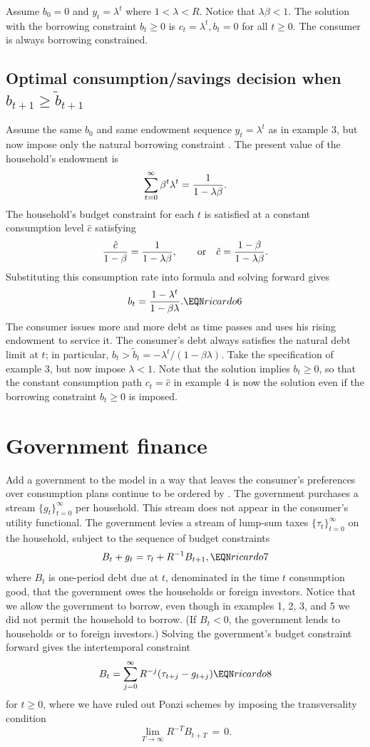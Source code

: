 \medskip
{} \quad  Assume $b_0=0$ and
$ y_t = \lambda^t$ where $1 < \lambda < R$.  Notice that
$\lambda \beta <1$.  The solution with the borrowing constraint
$b_t \geq 0$ is $c_t = \lambda^t , b_t=0$ for all $t \geq 0$.
The consumer is always borrowing constrained.
\medskip

\subsection{Optimal  consumption/savings decision when $b_{t+1} \geq \tilde b_{t+1}$}
 \quad  Assume the same  $b_0$ and same endowment
sequence $ y_t = \lambda^t$ as in example 3, but now impose only
the natural borrowing constraint .   The present
value of the household's endowment is
$$ \sum_{t=0}^\infty \beta^t \lambda^t = {1 \over 1 -\lambda \beta}.$$
The household's budget constraint for each $t$ is
satisfied at a constant consumption level $\hat c$ satisfying
$$
{\hat c \over 1 -\beta} = {1 \over 1-\lambda \beta}, \qquad \hbox{\rm or}
\quad  \hat c = {1-\beta \over 1 - \lambda \beta}.
$$   Substituting
this consumption rate into formula  and solving forward gives
$$ b_t =
   {1  - \lambda^t \over 1 - \beta \lambda }. \EQN ricardo6$$
   The consumer issues more and more debt as time passes
and uses his rising endowment to service it.   The
consumer's debt always satisfies the
natural debt limit at $t$; in particular, $ b_t > \tilde b_t = -\lambda^t /(1 - \beta \lambda)$.
\medskip
{} \quad   Take the specification of example 3,
but now impose  $\lambda <1$.    Note that the solution
 implies $b_t  \geq 0$, so that the constant consumption
path $c_t = \hat c$ in example 4
 is now the solution even if the borrowing constraint $b_t \geq 0$
is imposed.

\section{Government finance}
Add a government  to the model in a way that leaves the consumer's preferences over consumption plans continue to be ordered by
.   The government
purchases a stream $\{g_t\}_{t=0}^\infty$  per household.  This stream does not appear in the consumer's utility functional.
The government levies
 a stream of lump-sum taxes $\{\tau_t\}_{t=0}^\infty$
on the   household, subject to the sequence of budget constraints
$$ B_t + g_t = \tau_t + R^{-1} B_{t+1}, \EQN ricardo7 $$
where $B_t$ is one-period  debt  due at $t$, denominated
in the time $t$ consumption good, that the government owes the households
or foreign investors.  Notice that we allow the government
to borrow, even though in  examples 1, 2,  3, and 5
 we did not permit the household to borrow. (If $B_t <0$, the
government lends to households or to foreign investors.)  Solving the
government's budget constraint forward gives the intertemporal constraint
$$ B_t = \sum_{j=0}^\infty R^{-j}(\tau_{t+j} - g_{t+j}) \EQN ricardo8$$
for $t \geq 0$, where we have ruled out Ponzi schemes by imposing the
transversality condition
$$
\lim_{T\to\infty} R^{-T} B_{t+T} \,=\, 0.
$$

